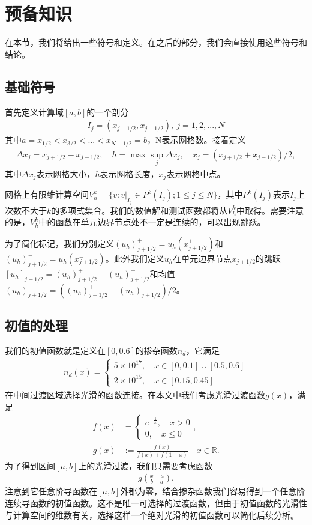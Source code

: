 \cleardoublepage

\section{预备知识}
在本节，我们将给出一些符号和定义。在之后的部分，我们会直接使用这些符号和结论。
\subsection{基础符号}
首先定义计算域$[a,b]$的一个剖分
\begin{align*}
    I_{j} = (x_{j-1/2}, x_{j+1/2}), \ j = 1, 2, ..., N
\end{align*}
其中$a=x_{1/2} < x_{3/2}< ...< x_{N+1/2}=b$，N表示网格数。接着定义
\begin{align*}
    \Delta x_j = x_{j+1/2}-x_{j-1/2}, \quad h = \max{\sup_j{\Delta x_j}}, \quad x_j = (x_{j+1/2}+x_{j-1/2})/{2},
\end{align*}
其中$\Delta x_j$表示网格大小，$h$表示网格长度，$x_j$表示网格中点。

网格上有限维计算空间$V_h^k = \{v:v|_{I_j}\in P^k(I_j); 1\leq j\leq N\}$，其中$P^k(I_j)$表示$I_j$上次数不大于$k$的多项式集合。我们的数值解和测试函数都将从$V_h^k$中取得。需要注意的是，$V_h^k$中的函数在单元边界节点处不一定是连续的，可以出现跳跃。

为了简化标记，我们分别定义$(u_h)^+_{j+1/2}=u_h(x^+_{j+1/2})$和$(u_h)^-_{j+1/2}=u_h(x^-_{j+1/2})$。此外我们定义$u_h$在单元边界节点$x_{j+1/2}$的跳跃$[u_h]_{j+1/2}=(u_h)^+_{j+1/2}-(u_h)^-_{j+1/2}$和均值$(\overline{u}_h)_{j+1/2}=((u_h)_{j+1/2}^++(u_h)_{j+1/2}^-)/2$。
\subsection{初值的处理}
我们的初值函数就是定义在$[0, 0.6]$的掺杂函数$n_d$，它满足
\begin{align*}
    n_d(x) = \begin{cases}
                 5\times 10^{17}, \quad x \in [0, 0.1] \cup [0.5, 0.6] \\
                 2\times 10^{15}, \quad x \in [0.15,0.45]
             \end{cases}
\end{align*}
在中间过渡区域选择光滑的函数连接。在本文中我们考虑光滑过渡函数$g(x)$，满足
\begin{align*}
    f(x)               & ={\begin{cases}
                               e^{-{\frac {1}{x}}}, \quad x>0 \\
                               0, \quad x\leq 0\end{cases}} ,                     \\
    \displaystyle g(x) & :={\frac {f(x)}{f(x)+f(1-x)}}\quad x\in \mathbb {R}.
\end{align*}
为了得到区间$[a,b]$上的光滑过渡，我们只需要考虑函数
\begin{align*}
    g(\frac{x-a}{b-a}).
\end{align*}
注意到它任意阶导函数在$[a,b]$外都为零，结合掺杂函数我们容易得到一个任意阶连续导函数的初值函数。这不是唯一可选择的过渡函数，但由于初值函数的光滑性与计算空间的维数有关，选择这样一个绝对光滑的初值函数可以简化后续分析。

